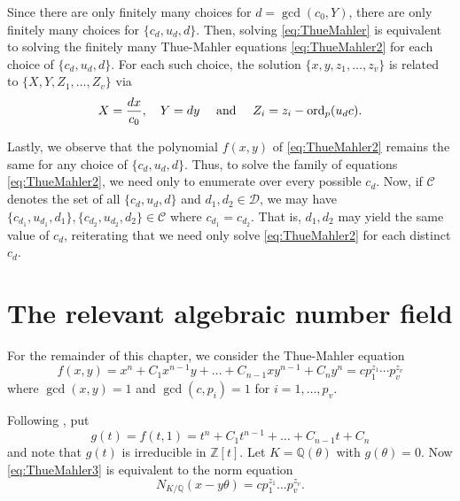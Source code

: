 Since there are only finitely many choices for $d = \gcd(c_0, Y)$, there are only finitely many choices for $\{c_d,u_d,d\}$. Then, solving \eqref{eq:ThueMahler} is equivalent to solving the finitely many Thue-Mahler equations \eqref{eq:ThueMahler2} for each choice of $\{c_d,u_d,d\}$.  For each such choice, the solution $\{x,y,z_1, \dots, z_v\}$ is related to $\{X,Y, Z_1, \dots, Z_v\}$ via
\[X = \frac{dx}{c_0},\quad Y=dy \quad \text{ and } \quad Z_i = z_i - \operatorname{ord}_p(u_dc).\]

Lastly, we observe that the polynomial $f(x,y)$ of \eqref{eq:ThueMahler2} remains the same for any choice of $\{c_d,u_d,d\}$. Thus, to solve the family of equations \eqref{eq:ThueMahler2}, we need only to enumerate over every possible $c_d$. Now, if $\mathcal{C}$ denotes the set of all $\{c_d,u_d,d\}$ and $d_1, d_2 \in \mathcal{D}$, we may have $\{c_{d_1},u_{d_1}, d_1\}, \{c_{d_2},u_{d_2}, d_2\} \in \mathcal{C}$ where $c_{d_1} = c_{d_2}$. That is, $d_1, d_2$ may yield the same value of $c_d$, reiterating that we need only solve \eqref{eq:ThueMahler2} for each distinct $c_d$. 


\section{The relevant algebraic number field}
\label{sec:RelevantAlgNumField}

For the remainder of this chapter, we consider the Thue-Mahler equation
\begin{equation} \label{eq:ThueMahler3}
f(x,y) = x^n + C_1 x^{n-1}y + \dots + C_{n-1}xy^{n-1} + C_ny^n = c p_1^{z_1} \cdots p_v^{z_v}
\end{equation}
where $\gcd(x,y) = 1$ and $\gcd(c,p_i) = 1$ for $i = 1, \dots, p_v$.

Following \cite{TW3}, put
\[g(t) = f(t,1) = t^n + C_1 t^{n-1} + \dots + C_{n-1}t + C_n\]
and note that $g(t)$ is irreducible in $\mathbb{Z}[t]$. Let $K = \mathbb{Q}(\theta)$ with $g(\theta) = 0$. Now \eqref{eq:ThueMahler3} is equivalent to the norm equation
\begin{equation} \label{eq:normTM}
N_{K/\mathbb{Q}}(x-y\theta) = cp_1^{z_1}\dots p_v^{z_v}.
\end{equation}

